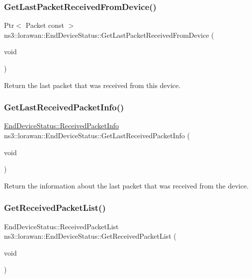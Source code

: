\subsubsection{\texorpdfstring{Get\+Last\+Packet\+Received\+From\+Device()}{GetLastPacketReceivedFromDevice()}}
{\footnotesize\ttfamily Ptr$<$ Packet const  $>$ ns3\+::lorawan\+::\+End\+Device\+Status\+::\+Get\+Last\+Packet\+Received\+From\+Device (\begin{DoxyParamCaption}\item[{void}]{ }\end{DoxyParamCaption})}

Return the last packet that was received from this device. \mbox{\label{classns3_1_1lorawan_1_1EndDeviceStatus_a282dab8b89f752ae913e22d348b24c3f}} 
\subsubsection{\texorpdfstring{Get\+Last\+Received\+Packet\+Info()}{GetLastReceivedPacketInfo()}}
{\footnotesize\ttfamily \hyperlink{structns3_1_1lorawan_1_1EndDeviceStatus_1_1ReceivedPacketInfo}{End\+Device\+Status\+::\+Received\+Packet\+Info} ns3\+::lorawan\+::\+End\+Device\+Status\+::\+Get\+Last\+Received\+Packet\+Info (\begin{DoxyParamCaption}\item[{void}]{ }\end{DoxyParamCaption})}

Return the information about the last packet that was received from the device. \mbox{\label{classns3_1_1lorawan_1_1EndDeviceStatus_af0ea395ca783b6bd3d55fc8f5cba704d}} 
\subsubsection{\texorpdfstring{Get\+Received\+Packet\+List()}{GetReceivedPacketList()}}
{\footnotesize\ttfamily End\+Device\+Status\+::\+Received\+Packet\+List ns3\+::lorawan\+::\+End\+Device\+Status\+::\+Get\+Received\+Packet\+List (\begin{DoxyParamCaption}\item[{void}]{ }\end{DoxyParamCaption})}

